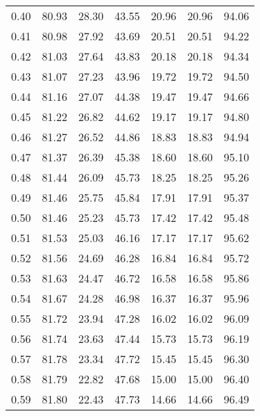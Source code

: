 \begin{tabular}{|c|c|c|c|c|c|c|}
      0.40 &     80.93 &     28.30 &      43.55 &   20.96 &      20.96 &         94.06 \\
      0.41 &     80.98 &     27.92 &      43.69 &   20.51 &      20.51 &         94.22 \\
      0.42 &     81.03 &     27.64 &      43.83 &   20.18 &      20.18 &         94.34 \\
      0.43 &     81.07 &     27.23 &      43.96 &   19.72 &      19.72 &         94.50 \\
      0.44 &     81.16 &     27.07 &      44.38 &   19.47 &      19.47 &         94.66 \\
      0.45 &     81.22 &     26.82 &      44.62 &   19.17 &      19.17 &         94.80 \\
      0.46 &     81.27 &     26.52 &      44.86 &   18.83 &      18.83 &         94.94 \\
      0.47 &     81.37 &     26.39 &      45.38 &   18.60 &      18.60 &         95.10 \\
      0.48 &     81.44 &     26.09 &      45.73 &   18.25 &      18.25 &         95.26 \\
      0.49 &     81.46 &     25.75 &      45.84 &   17.91 &      17.91 &         95.37 \\
      0.50 &     81.46 &     25.23 &      45.73 &   17.42 &      17.42 &         95.48 \\
      0.51 &     81.53 &     25.03 &      46.16 &   17.17 &      17.17 &         95.62 \\
      0.52 &     81.56 &     24.69 &      46.28 &   16.84 &      16.84 &         95.72 \\
      0.53 &     81.63 &     24.47 &      46.72 &   16.58 &      16.58 &         95.86 \\
      0.54 &     81.67 &     24.28 &      46.98 &   16.37 &      16.37 &         95.96 \\
      0.55 &     81.72 &     23.94 &      47.28 &   16.02 &      16.02 &         96.09 \\
      0.56 &     81.74 &     23.63 &      47.44 &   15.73 &      15.73 &         96.19 \\
      0.57 &     81.78 &     23.34 &      47.72 &   15.45 &      15.45 &         96.30 \\
      0.58 &     81.79 &     22.82 &      47.68 &   15.00 &      15.00 &         96.40 \\
      0.59 &     81.80 &     22.43 &      47.73 &   14.66 &      14.66 &         96.49 \\

\end{tabular}

